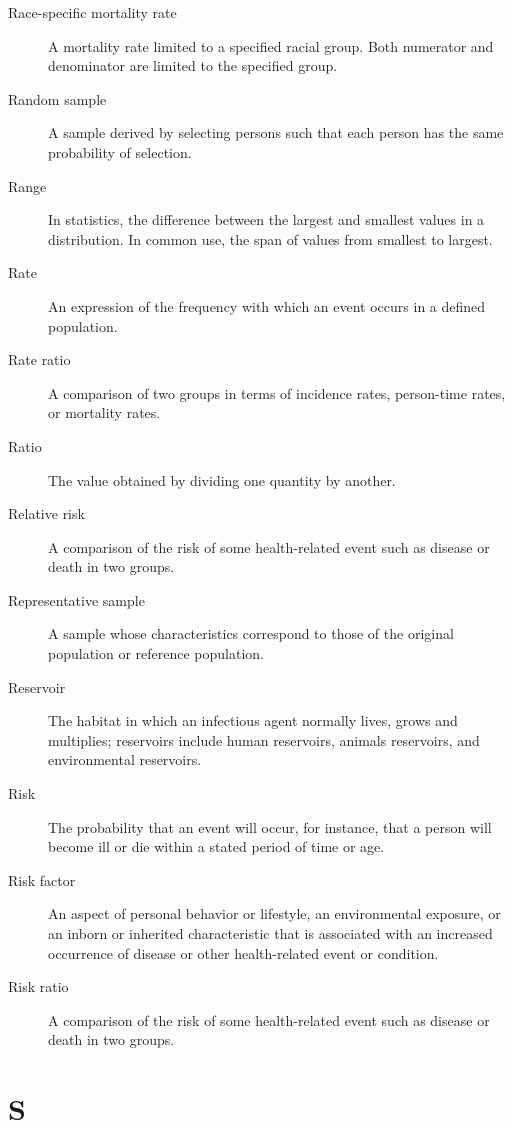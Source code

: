 \documentclass[11pt]{article}
\begin{document}
\begin{description}
\item[Race-specific mortality rate] A mortality rate limited to a
specified racial group. Both numerator and denominator are
limited to the specified group.
\item[Random sample] A sample derived by selecting persons such
that each person has the same probability of selection.
\item[Range] In statistics, the difference between the largest
and smallest values in a distribution. In common use, the span of
values from smallest to largest.
\item[Rate] An expression of the frequency with which an event
occurs in a defined population.
\item[Rate ratio] A comparison of two groups in terms of
incidence rates, person-time rates, or mortality rates.
\item[Ratio] The value obtained by dividing one quantity by
another.
\item[Relative risk] A comparison of the risk of some
health-related event such as disease or death in two groups.
\item[Representative sample] A sample whose characteristics
correspond to those of the original population or reference
population.
\item[Reservoir] The habitat in which an infectious agent
normally lives, grows and multiplies; reservoirs include human
reservoirs, animals reservoirs, and environmental reservoirs.
\item[Risk] The probability that an event will occur, for
instance, that a person will become ill or die within a stated
period of time or age.
\item[Risk factor] An aspect of personal behavior or lifestyle,
an environmental exposure, or an inborn or inherited
characteristic that is associated with an increased occurrence
of disease or other health-related event or condition.
\item[Risk ratio] A comparison of the risk of some health-related
event such as disease or death in two groups.
\end{description}

\section*{S}
\end{document}
